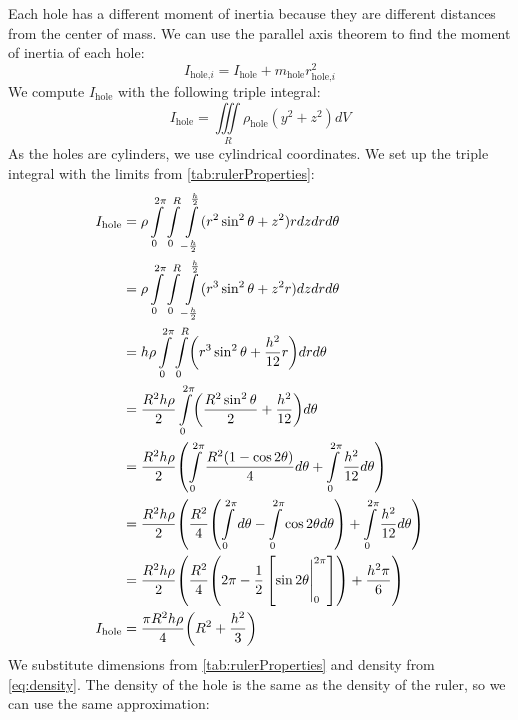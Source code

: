 \documentclass[article, 12pt]{article}
\DeclarePairedDelimiter\paren{(}{)} %
\newcommand{\tplint}[6]{\int\limits^{#1}_{#2}\int\limits^{#3}_{#4}\int\limits^{#5}_{#6}} %
\newcommand{\dblint}[4]{\int\limits^{#1}_{#2}\int\limits^{#3}_{#4}} %
\newcommand{\sglint}[2]{\int\limits^{#1}_{#2}} %
\begin{document}
\begin{enumerate}[1)]
\begin{equation}
    \end{equation}
    Each hole has a different moment of inertia because they are different distances from the center of mass. We can use the parallel axis theorem to find the moment of inertia of each hole:
    \begin{equation}
        I_{\text{hole,}i} = I_{\text{hole}} + m_{\text{hole}}r_{\text{hole,}i}^2
        \label{eq:parallelAxisHole}
    \end{equation}
    We compute $I_{\text{hole}}$ with the following triple integral:
    \begin{equation}
        I_{\text{hole}} = \iiint \limits_{R} \rho_{\text{hole}} (y^2 + z^2) dV
    \end{equation}
    As the holes are cylinders, we use cylindrical coordinates. We set up the triple integral with the limits from \autoref{tab:rulerProperties}:
    \begin{align}
        I_{\text{hole}} &= \rho \tplint{2\pi}{0}{R}{0}{\frac{h}{2}}{-\frac{h}{2}} (r^2\sin^2\theta + z^2) r dz dr d\theta \nonumber\\
                        &= \rho \tplint{2\pi}{0}{R}{0}{\frac{h}{2}}{-\frac{h}{2}} (r^3\sin^2\theta + z^2r) dz dr d\theta \nonumber\\
                        &= h \rho \dblint{2\pi}{0}{R}{0} \paren*{r^3\sin^2\theta + \frac{h^2}{12}r} dr d\theta \nonumber\\
                        &= \frac{R^2h\rho}{2} \sglint{2\pi}{0} \paren*{\frac{R^2\sin^2\theta}{2} + \frac{h^2}{12}} d\theta \nonumber\\
                        &= \frac{R^2h\rho}{2} \paren*{\sglint{2\pi}{0} \frac{R^2(1-\cos{2\theta})}{4}d\theta + \sglint{2\pi}{0} \frac{h^2}{12}d\theta} \nonumber\\
                        &= \frac{R^2h\rho}{2} \paren*{\frac{R^2}{4}\paren*{\sglint{2\pi}{0} d\theta - \sglint{2\pi}{0} {\cos{2\theta}}d\theta} + \sglint{2\pi}{0} \frac{h^2}{12}d\theta} \nonumber\\
                        &= \frac{R^2h\rho}{2} \paren*{\frac{R^2}{4} \paren*{2\pi - \frac{1}{2}\left[\sin{2\theta} \Bigg\rvert_{0}^{2\pi} \right]} + \frac{h^2\pi}{6}} \nonumber\\
        I_\text{hole}   &= \frac{\pi R^2h\rho}{4} \paren*{R^2 + \frac{h^2}{3}} \nonumber
    \end{align}
    We substitute dimensions from \autoref{tab:rulerProperties} and density from \autoref{eq:density}. The density of the hole is the same as the density of the ruler, so we can use the same approximation:

\end{enumerate}
\end{document}
